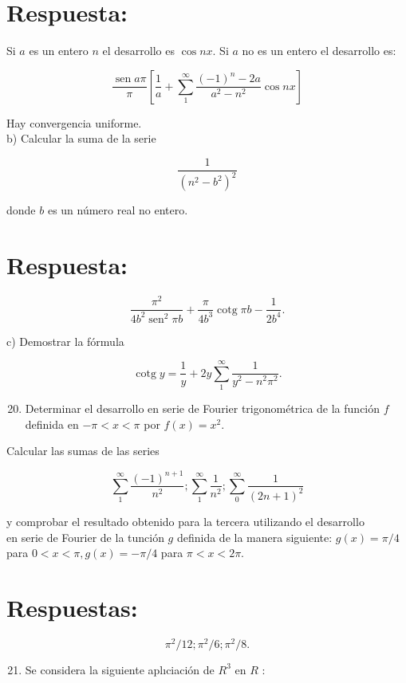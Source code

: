 \documentclass[10pt]{article}
\theoremstyle{plain}
\theoremstyle{definition}
\theoremstyle{remark}
\begin{document}
\section*{Respuesta:}
Si $a$ es un entero $n$ el desarrollo es $\cos n x$. Si $a$ no es un entero el desarrollo es:

$$
\frac{\operatorname{sen} a \pi}{\pi}\left[\frac{1}{a}+\sum_{1}^{\infty} \frac{(-1)^{n}-2 a}{a^{2}-n^{2}} \cos n x\right]
$$

Hay convergencia uniforme.\\
b) Calcular la suma de la serie

$$
\frac{1}{\left(n^{2}-b^{2}\right)^{2}}
$$

donde $b$ es un número real no entero.

\section*{Respuesta:}
$$
\frac{\pi^{2}}{4 b^{2} \operatorname{sen}^{2} \pi b}+\frac{\pi}{4 b^{3}} \operatorname{cotg} \pi b-\frac{1}{2 b^{4}} .
$$

c) Demostrar la fórmula

$$
\operatorname{cotg} y=\frac{1}{y}+2 y \sum_{1}^{\infty} \frac{1}{y^{2}-n^{2} \pi^{2}} .
$$

\begin{enumerate}
  \setcounter{enumi}{19}
  \item Determinar el desarrollo en serie de Fourier trigonométrica de la función $f$ definida en $-\pi<x<\pi$ por $f(x)=x^{2}$.
\end{enumerate}

Calcular las sumas de las series

$$
\sum_{1}^{\infty} \frac{(-1)^{n+1}}{n^{2}} ; \sum_{1}^{\infty} \frac{1}{n^{2}} ; \sum_{0}^{\infty} \frac{1}{(2 n+1)^{2}}
$$

y comprobar el resultado obtenido para la tercera utilizando el desarrollo\\
en serie de Fourier de la tunción $g$ definida de la manera siguiente: $g(x)=\pi / 4$ para $0<x<\pi, g(x)=-\pi / 4$ para $\pi<x<2 \pi$.

\section*{Respuestas:}
$$
\pi^{2} / 12 ; \pi^{2} / 6 ; \pi^{2} / 8 .
$$

\begin{enumerate}
  \setcounter{enumi}{20}
  \item Se considera la siguiente aplıciación de $R^{3}$ en $R$ :
\end{enumerate}
\end{document}
